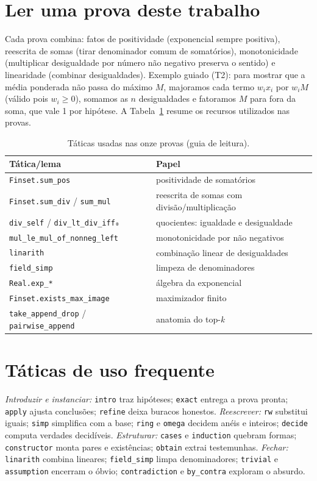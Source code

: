 \documentclass[12pt,openany,oneside,a4paper,brazil,chapter=TITLE]{abntex2}
\begin{document}
\section{Ler uma prova deste trabalho}
Cada prova combina: fatos de positividade (exponencial sempre positiva), reescrita de somas (tirar denominador comum de somatórios), monotonicidade (multiplicar desigualdade por número não negativo preserva o sentido) e linearidade (combinar desigualdades). Exemplo guiado (T2): para mostrar que a média ponderada não passa do máximo $M$, majoramos cada termo $w_ix_i$ por $w_iM$ (válido pois $w_i\geq0$), somamos as $n$ desigualdades e fatoramos $M$ para fora da soma, que vale 1 por hipótese.
A Tabela~\ref{tab:taticas} resume os recursos utilizados nas provas.
\begin{table}[htbp]
\fontsize{10}{12}\selectfont\SingleSpacing
\centering
\caption{Táticas usadas nas onze provas (guia de leitura).}
\label{tab:taticas}\begin{tabularx}{\textwidth}{XX}
\toprule
Tática/lema & Papel \\
\midrule
\texttt{Finset.sum\_pos} & positividade de somatórios \\
\texttt{Finset.sum\_div} / \texttt{sum\_mul} & reescrita de somas com divisão/multiplicação \\
\texttt{div\_self} / \texttt{div\_lt\_div\_iff₀} & quocientes: igualdade e desigualdade \\
\nolinkurl{mul_le_mul_of_nonneg_left} & monotonicidade por não negativos \\
\texttt{linarith} & combinação linear de desigualdades \\
\texttt{field\_simp} & limpeza de denominadores \\
\texttt{Real.exp\_*} & álgebra da exponencial \\
\nolinkurl{Finset.exists_max_image} & maximizador finito \\
\texttt{take\_append\_drop} / \texttt{pairwise\_append} & anatomia do top-\textit{k} \\
\bottomrule
\end{tabularx}
\end{table}
\section{Táticas de uso frequente}
\textit{Introduzir e instanciar:} \texttt{intro} traz hipóteses; \texttt{exact} entrega a prova pronta; \texttt{apply} ajusta conclusões; \texttt{refine} deixa buracos honestos. \textit{Reescrever:} \texttt{rw} substitui iguais; \texttt{simp} simplifica com a base; \texttt{ring} e \texttt{omega} decidem anéis e inteiros; \texttt{decide} computa verdades decidíveis. \textit{Estruturar:} \texttt{cases} e \texttt{induction} quebram formas; \texttt{constructor} monta pares e existências; \texttt{obtain} extrai testemunhas. \textit{Fechar:} \texttt{linarith} combina lineares; \texttt{field\_simp} limpa denominadores; \texttt{trivial} e \texttt{assumption} encerram o óbvio; \texttt{contradiction} e \texttt{by\_contra} exploram o absurdo.
\end{document}
